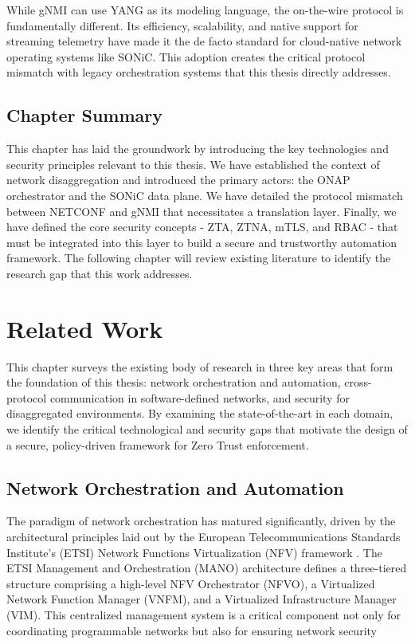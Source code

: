 \documentclass[12pt, a4paper, reqno, oneside]{book}
\begin{document}
While gNMI can use YANG as its modeling language, the on-the-wire protocol is fundamentally different. Its efficiency, scalability, and native support for streaming telemetry have made it the de facto standard for cloud-native network operating systems like SONiC. This adoption creates the critical protocol mismatch with legacy orchestration systems that this thesis directly addresses.



\section{Chapter Summary}
This chapter has laid the groundwork by introducing the key technologies and security principles relevant to this thesis. We have established the context of network disaggregation and introduced the primary actors: the ONAP orchestrator and the SONiC data plane. We have detailed the protocol mismatch between NETCONF and gNMI that necessitates a translation layer. Finally, we have defined the core security concepts - ZTA, ZTNA, mTLS, and RBAC - that must be integrated into this layer to build a secure and trustworthy automation framework. The following chapter will review existing literature to identify the research gap that this work addresses.


\newpage
\chapter{Related Work}
\label{chap:related}

This chapter surveys the existing body of research in three key areas that form the foundation of this thesis: network orchestration and automation, cross-protocol communication in software-defined networks, and security for disaggregated environments. By examining the state-of-the-art in each domain, we identify the critical technological and security gaps that motivate the design of a secure, policy-driven framework for Zero Trust enforcement.

\section{Network Orchestration and Automation}
\label{sec:related_orchestration}
The paradigm of network orchestration has matured significantly, driven by the architectural principles laid out by the European Telecommunications Standards Institute's (ETSI) Network Functions Virtualization (NFV) framework \cite{han2015network}. The ETSI Management and Orchestration (MANO) architecture defines a three-tiered structure comprising a high-level NFV Orchestrator (NFVO), a Virtualized Network Function Manager (VNFM), and a Virtualized Infrastructure Manager (VIM). This centralized management system is a critical component not only for coordinating programmable networks but also for ensuring network security
\end{document}
